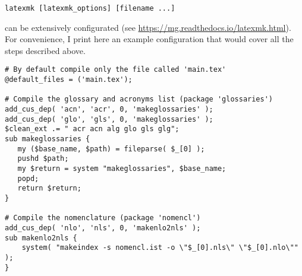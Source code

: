\begin{lstlisting}
latexmk [latexmk_options] [filename ...]
\end{lstlisting}

 can be extensively configurated (see 
\url{https://mg.readthedocs.io/latexmk.html}). For convenience, I print 
here an example configuration that would cover all the steps described 
above.

\begin{lstlisting}
# By default compile only the file called 'main.tex'
@default_files = ('main.tex');

# Compile the glossary and acronyms list (package 'glossaries')
add_cus_dep( 'acn', 'acr', 0, 'makeglossaries' );
add_cus_dep( 'glo', 'gls', 0, 'makeglossaries' );
$clean_ext .= " acr acn alg glo gls glg";
sub makeglossaries {
   my ($base_name, $path) = fileparse( $_[0] );
   pushd $path;
   my $return = system "makeglossaries", $base_name;
   popd;
   return $return;
}

# Compile the nomenclature (package 'nomencl')
add_cus_dep( 'nlo', 'nls', 0, 'makenlo2nls' );
sub makenlo2nls {
    system( "makeindex -s nomencl.ist -o \"$_[0].nls\" \"$_[0].nlo\"" );
}
\end{lstlisting}

